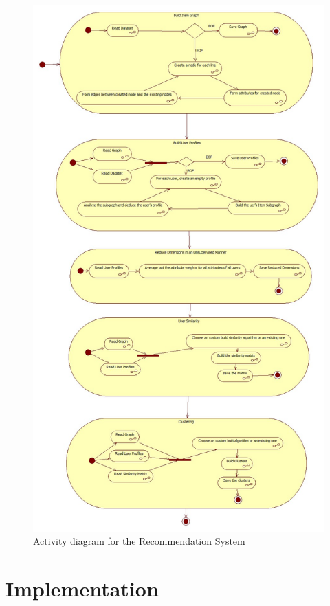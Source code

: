 \documentclass[11pt]{article}
\begin{document}
\begin{figure}[htp]
\centering
\includegraphics[scale=0.35]{Images/ActivityDiagram.jpg}
\caption{Activity diagram for the Recommendation System}
\label{activitydiagram}
\end{figure}

\section{Implementation}
\end{document}
